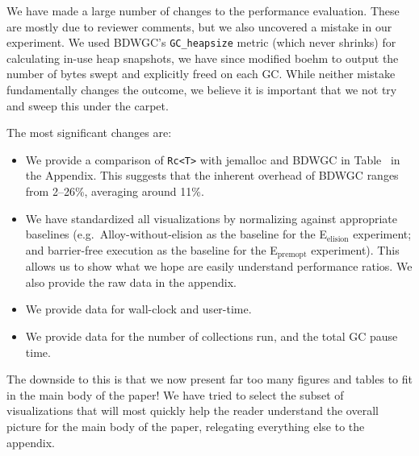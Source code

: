 \documentclass[12pt,a4paper,preprint]{article}
\newcommand\Eelision{E$_\textrm{elision}$\xspace}
\newcommand\Epremopt{E$_\textrm{premopt}$\xspace}
\newcommand\boehm{\textsc{BDWGC}\xspace}
\begin{document}
We have made a large number of changes to the performance evaluation. These are
mostly due to reviewer comments, but we also uncovered a mistake in our
experiment. We used \boehm's \lstinline{GC_heapsize} metric (which never
shrinks) for calculating in-use heap snapshots, we have since modified boehm to
output the number of bytes swept and explicitly freed on each GC. While neither mistake
fundamentally changes the outcome, we believe it is important that we not
try and sweep this under the carpet. 


The most significant changes are:

\begin{itemize}
  \item We provide a comparison of \lstinline{Rc<T>} with jemalloc and \boehm
    in Table~ in the Appendix. This suggests that the inherent
    overhead of \boehm ranges from 2--26\%, averaging around 11\%.

  \item We have standardized all visualizations by normalizing against
    appropriate baselines (e.g.~Alloy-without-elision as the baseline for
    the \Eelision experiment; and barrier-free execution as the baseline
    for the \Epremopt experiment). This allows us to show what we hope
    are easily understand performance ratios. We also provide the raw data
    in the appendix.

  \item We provide data for wall-clock and user-time.

  \item We provide data for the number of collections run, and the total GC
  pause time.
\end{itemize}

The downside to this is that we now present far too many figures and tables to
fit in the main body of the paper! We have tried to select the subset of
visualizations that will most quickly help the reader understand the overall
picture for the main body of the paper, relegating everything else to the
appendix.
\end{document}

